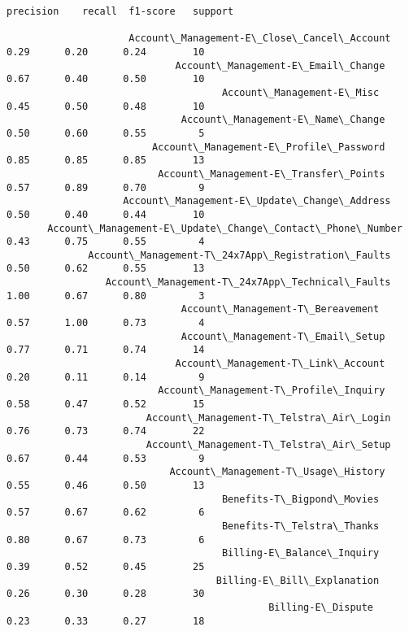 \documentclass[11pt]{article}
\begin{document}
    \begin{Verbatim}[commandchars=\\\{\}]
                                                                precision    recall  f1-score   support

                     Account\_Management-E\_Close\_Cancel\_Account       0.29      0.20      0.24        10
                             Account\_Management-E\_Email\_Change       0.67      0.40      0.50        10
                                     Account\_Management-E\_Misc       0.45      0.50      0.48        10
                              Account\_Management-E\_Name\_Change       0.50      0.60      0.55         5
                         Account\_Management-E\_Profile\_Password       0.85      0.85      0.85        13
                          Account\_Management-E\_Transfer\_Points       0.57      0.89      0.70         9
                    Account\_Management-E\_Update\_Change\_Address       0.50      0.40      0.44        10
       Account\_Management-E\_Update\_Change\_Contact\_Phone\_Number       0.43      0.75      0.55         4
              Account\_Management-T\_24x7App\_Registration\_Faults       0.50      0.62      0.55        13
                 Account\_Management-T\_24x7App\_Technical\_Faults       1.00      0.67      0.80         3
                              Account\_Management-T\_Bereavement       0.57      1.00      0.73         4
                              Account\_Management-T\_Email\_Setup       0.77      0.71      0.74        14
                             Account\_Management-T\_Link\_Account       0.20      0.11      0.14         9
                          Account\_Management-T\_Profile\_Inquiry       0.58      0.47      0.52        15
                        Account\_Management-T\_Telstra\_Air\_Login       0.76      0.73      0.74        22
                        Account\_Management-T\_Telstra\_Air\_Setup       0.67      0.44      0.53         9
                            Account\_Management-T\_Usage\_History       0.55      0.46      0.50        13
                                     Benefits-T\_Bigpond\_Movies       0.57      0.67      0.62         6
                                     Benefits-T\_Telstra\_Thanks       0.80      0.67      0.73         6
                                     Billing-E\_Balance\_Inquiry       0.39      0.52      0.45        25
                                    Billing-E\_Bill\_Explanation       0.26      0.30      0.28        30
                                             Billing-E\_Dispute       0.23      0.33      0.27        18

\end{Verbatim}
\end{document}
